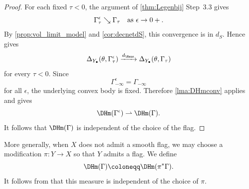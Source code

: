 \begin{proof}
For each fixed $\tau<0$, the argument of \cref{thm:Legenbij} Step~3.3 gives
\[
    \Gamma^\epsilon_\tau\searrow \Gamma_\tau \quad\textup{as }\epsilon\to 0+.
\]
By \cref{prop:vol_limit_model} and \cref{cor:decnetdS}, this convergence is in $d_S$. Hence  gives
\[
    \Delta_{Y_\bullet}(\theta,\Gamma^\epsilon_\tau)\xrightarrow{d_{\Haus}}\Delta_{Y_\bullet}(\theta,\Gamma_\tau)
\]
for every $\tau<0$. Since
\[
    \Gamma^\epsilon_{-\infty}=\Gamma_{-\infty}
\]
for all $\epsilon$, the underlying convex body is fixed. Therefore \cref{lma:DHmconv} applies and gives
\[
    \DHm(\Gamma^\epsilon)\rightharpoonup\DHm(\Gamma).
\]
It follows that $\DHm(\Gamma)$ is independent of the choice of the flag.
\end{proof}

More generally, when $X$ does not admit a smooth flag, we may choose a modification $\pi\colon Y\rightarrow X$ so that $Y$ admits a flag. We define
\begin{equation}\label{eq:DHmgeneral}
\DHm(\Gamma)\coloneqq \DHm(\pi^*\Gamma).
\end{equation}
It follows from  that this measure is independent of the choice of $\pi$.



